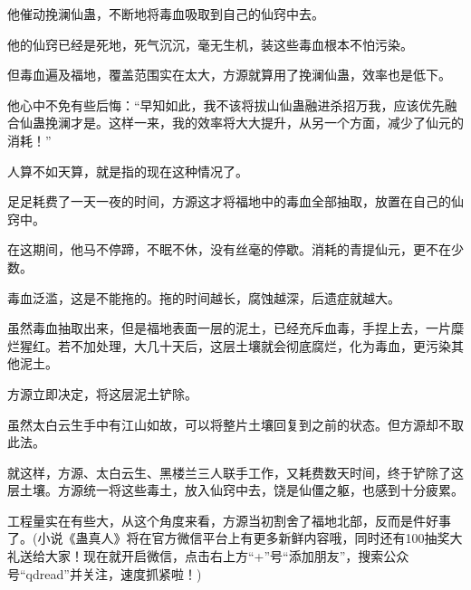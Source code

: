 \begin{this_body}
他催动挽澜仙蛊，不断地将毒血吸取到自己的仙窍中去。

他的仙窍已经是死地，死气沉沉，毫无生机，装这些毒血根本不怕污染。

但毒血遍及福地，覆盖范围实在太大，方源就算用了挽澜仙蛊，效率也是低下。

他心中不免有些后悔：“早知如此，我不该将拔山仙蛊融进杀招万我，应该优先融合仙蛊挽澜才是。这样一来，我的效率将大大提升，从另一个方面，减少了仙元的消耗！”

人算不如天算，就是指的现在这种情况了。

足足耗费了一天一夜的时间，方源这才将福地中的毒血全部抽取，放置在自己的仙窍中。

在这期间，他马不停蹄，不眠不休，没有丝毫的停歇。消耗的青提仙元，更不在少数。

毒血泛滥，这是不能拖的。拖的时间越长，腐蚀越深，后遗症就越大。

虽然毒血抽取出来，但是福地表面一层的泥土，已经充斥血毒，手捏上去，一片糜烂猩红。若不加处理，大几十天后，这层土壤就会彻底腐烂，化为毒血，更污染其他泥土。

方源立即决定，将这层泥土铲除。

虽然太白云生手中有江山如故，可以将整片土壤回复到之前的状态。但方源却不取此法。

就这样，方源、太白云生、黑楼兰三人联手工作，又耗费数天时间，终于铲除了这层土壤。方源统一将这些毒土，放入仙窍中去，饶是仙僵之躯，也感到十分疲累。

工程量实在有些大，从这个角度来看，方源当初割舍了福地北部，反而是件好事了。(小说《蛊真人》将在官方微信平台上有更多新鲜内容哦，同时还有100抽奖大礼送给大家！现在就开启微信，点击右上方“+”号“添加朋友”，搜索公众号“qdread”并关注，速度抓紧啦！)

\end{this_body}

